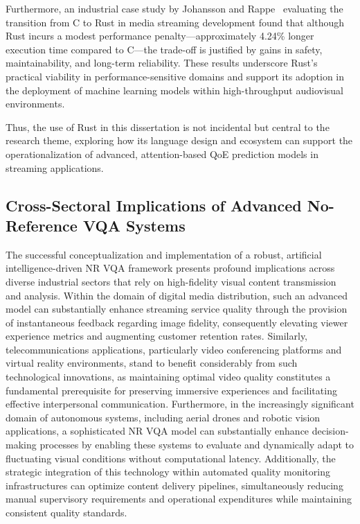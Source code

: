 Furthermore, an industrial case study by Johansson and Rappe~\cite{johansson2023transitioning} evaluating the transition from C to Rust in media streaming development found that although Rust incurs a modest performance penalty—approximately 4.24\% longer execution time compared to C—the trade-off is justified by gains in safety, maintainability, and long-term reliability. These results underscore Rust’s practical viability in performance-sensitive domains and support its adoption in the deployment of machine learning models within high-throughput audiovisual environments.

Thus, the use of Rust in this dissertation is not incidental but central to the research theme, exploring how its language design and ecosystem can support the operationalization of advanced, attention-based QoE prediction models in streaming applications.

\subsection{Cross-Sectoral Implications of Advanced No-Reference VQA Systems}

The successful conceptualization and implementation of a robust, artificial intelligence-driven NR VQA framework presents profound implications across diverse industrial sectors that rely on high-fidelity visual content transmission and analysis. Within the domain of digital media distribution, such an advanced model can substantially enhance streaming service quality through the provision of instantaneous feedback regarding image fidelity, consequently elevating viewer experience metrics and augmenting customer retention rates. Similarly, telecommunications applications, particularly video conferencing platforms and virtual reality environments, stand to benefit considerably from such technological innovations, as maintaining optimal video quality constitutes a fundamental prerequisite for preserving immersive experiences and facilitating effective interpersonal communication. Furthermore, in the increasingly significant domain of autonomous systems, including aerial drones and robotic vision applications, a sophisticated NR VQA model can substantially enhance decision-making processes by enabling these systems to evaluate and dynamically adapt to fluctuating visual conditions without computational latency. Additionally, the strategic integration of this technology within automated quality monitoring infrastructures can optimize content delivery pipelines, simultaneously reducing manual supervisory requirements and operational expenditures while maintaining consistent quality standards.

